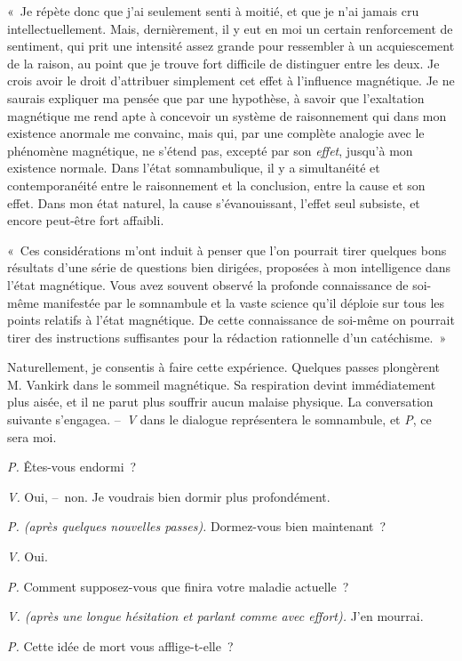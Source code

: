 \documentclass[french,twoside]{book} %
\begin{document}
« Je répète donc que j’ai seulement senti à moitié, et que je n’ai jamais cru intellectuellement. Mais, dernièrement, il y eut en moi un certain renforcement de sentiment, qui prit une intensité assez grande pour ressembler à un acquiescement de la raison, au point que je trouve fort difficile de distinguer entre les deux. Je crois avoir le droit d’attribuer simplement cet effet à l’influence magnétique. Je ne saurais expliquer ma pensée que par une hypothèse, à savoir que l’exaltation magnétique me rend apte à concevoir un système de raisonnement qui dans mon existence anormale me convainc, mais qui, par une complète analogie avec le phénomène magnétique, ne s’étend pas, excepté par son \emph{effet}, jusqu’à mon existence normale. Dans l’état somnambulique, il y a simultanéité et contemporanéité entre le raisonnement et la conclusion, entre la cause et son effet. Dans mon état naturel, la cause s’évanouissant, l’effet seul subsiste, et encore peut-être fort affaibli.\par
« Ces considérations m’ont induit à penser que l’on pourrait tirer quelques bons résultats d’une série de questions bien dirigées, proposées à mon intelligence dans l’état magnétique. Vous avez souvent observé la profonde connaissance de soi-même manifestée par le somnambule et la vaste science qu’il déploie sur tous les points relatifs à l’état magnétique. De cette connaissance de soi-même on pourrait tirer des instructions suffisantes pour la rédaction rationnelle d’un catéchisme. »\par
Naturellement, je consentis à faire cette expérience. Quelques passes plongèrent M. Vankirk dans le sommeil magnétique. Sa respiration devint immédiatement plus aisée, et il ne parut plus souffrir aucun malaise physique. La conversation suivante s’engagea. – \emph{V} dans le dialogue représentera le somnambule, et \emph{P}, ce sera moi.\par
\emph{P.} Êtes-vous endormi ?\par
\emph{V.} Oui, – non. Je voudrais bien dormir plus profondément.\par
\emph{P. (après quelques nouvelles passes).} Dormez-vous bien maintenant ?\par
\emph{V.} Oui.\par
\emph{P.} Comment supposez-vous que finira votre maladie actuelle ?\par
\emph{V. (après une longue hésitation et parlant comme avec effort).} J’en mourrai.\par
\emph{P.} Cette idée de mort vous afflige-t-elle ?\par
\end{document}
